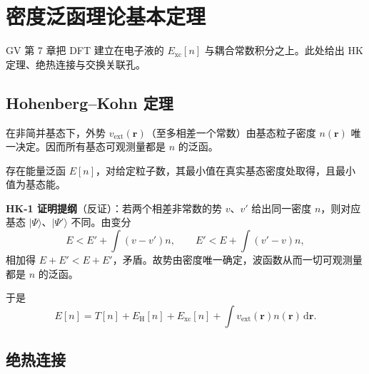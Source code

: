 \section{密度泛函理论基本定理}

GV 第 7 章把 DFT 建立在电子液的 $E_{\mathrm{xc}}[n]$ 与耦合常数积分之上。此处给出 HK 定理、绝热连接与交换关联孔。

\subsection{Hohenberg--Kohn 定理}

\begin{theorem}[HK-1]
在非简并基态下，外势 $v_{\mathrm{ext}}(\mathbf{r})$（至多相差一个常数）由基态粒子密度 $n(\mathbf{r})$ 唯一决定。因而所有基态可观测量都是 $n$ 的泛函。
\end{theorem}

\begin{theorem}[HK-2]
存在能量泛函 $E[n]$，对给定粒子数，其最小值在真实基态密度处取得，且最小值为基态能。
\end{theorem}

\textbf{HK-1 证明提纲}（反证）：若两个相差非常数的势 $v$、$v'$ 给出同一密度 $n$，则对应基态 $|\Psi\rangle$、$|\Psi'\rangle$ 不同。由变分
\begin{equation}
  E<E'+\int(v-v')n,
  \qquad
  E'<E+\int(v'-v)n,
\end{equation}
相加得 $E+E'<E+E'$，矛盾。故势由密度唯一确定，波函数从而一切可观测量都是 $n$ 的泛函。

于是
\begin{equation}
  E[n]
  =T[n]+E_{\mathrm{H}}[n]+E_{\mathrm{xc}}[n]
  +\int v_{\mathrm{ext}}(\mathbf{r})n(\mathbf{r})\,\mathrm{d}\mathbf{r}.
\end{equation}

\subsection{绝热连接}

